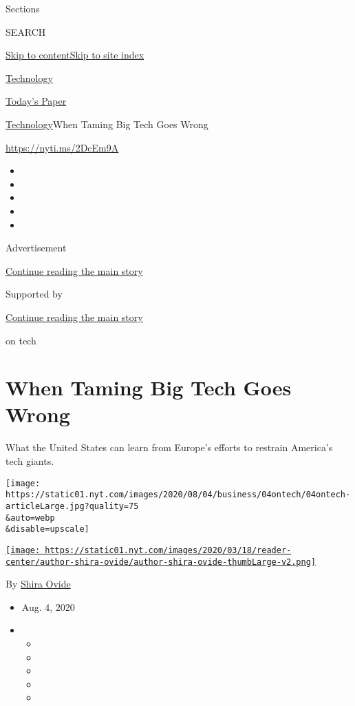 Sections

SEARCH

\protect\hyperlink{site-content}{Skip to
content}\protect\hyperlink{site-index}{Skip to site index}

\href{https://www.nytimes.com/section/technology}{Technology}

\href{https://myaccount.nytimes.com/auth/login?response_type=cookie\&client_id=vi}{}

\href{https://www.nytimes.com/section/todayspaper}{Today's Paper}

\href{/section/technology}{Technology}\textbar{}When Taming Big Tech
Goes Wrong

\url{https://nyti.ms/2DcEm9A}

\begin{itemize}
\item
\item
\item
\item
\item
\end{itemize}

Advertisement

\protect\hyperlink{after-top}{Continue reading the main story}

Supported by

\protect\hyperlink{after-sponsor}{Continue reading the main story}

on tech

\hypertarget{when-taming-big-tech-goes-wrong}{%
\section{When Taming Big Tech Goes
Wrong}\label{when-taming-big-tech-goes-wrong}}

What the United States can learn from Europe's efforts to restrain
America's tech giants.

\texttt{[image: https://static01.nyt.com/images/2020/08/04/business/04ontech/04ontech-articleLarge.jpg?quality=75\\\&auto=webp\\\&disable=upscale]}

\href{https://www.nytimes.com/by/shira-ovide}{\texttt{[image: https://static01.nyt.com/images/2020/03/18/reader-center/author-shira-ovide/author-shira-ovide-thumbLarge-v2.png]}}

By \href{https://www.nytimes.com/by/shira-ovide}{Shira Ovide}

\begin{itemize}
\item
  Aug. 4, 2020
\item
  \begin{itemize}
  \item
  \item
  \item
  \item
  \item
  \end{itemize}
\end{itemize}


